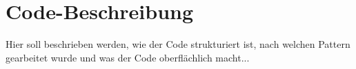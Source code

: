 \section{Code-Beschreibung} \label{chpt:Implementierung_Beschreibung}

Hier soll beschrieben werden, wie der Code strukturiert ist, nach welchen Pattern gearbeitet wurde und was der Code oberflächlich macht...